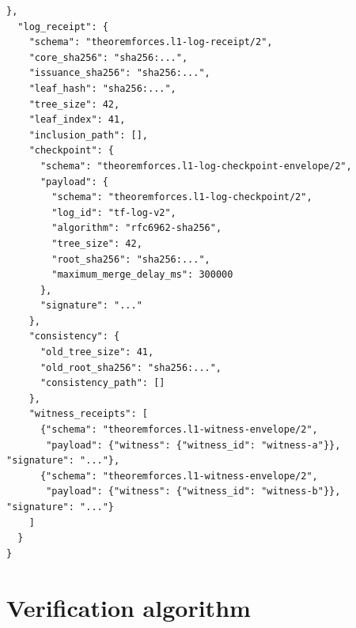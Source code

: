 \documentclass[a4paper,11pt]{ltjsarticle}
\begin{document}
\begin{lstlisting}[language={},basicstyle=\ttfamily\scriptsize,caption={Cycle-free certificate envelope topology}]
  },
  "log_receipt": {
    "schema": "theoremforces.l1-log-receipt/2",
    "core_sha256": "sha256:...",
    "issuance_sha256": "sha256:...",
    "leaf_hash": "sha256:...",
    "tree_size": 42,
    "leaf_index": 41,
    "inclusion_path": [],
    "checkpoint": {
      "schema": "theoremforces.l1-log-checkpoint-envelope/2",
      "payload": {
        "schema": "theoremforces.l1-log-checkpoint/2",
        "log_id": "tf-log-v2",
        "algorithm": "rfc6962-sha256",
        "tree_size": 42,
        "root_sha256": "sha256:...",
        "maximum_merge_delay_ms": 300000
      },
      "signature": "..."
    },
    "consistency": {
      "old_tree_size": 41,
      "old_root_sha256": "sha256:...",
      "consistency_path": []
    },
    "witness_receipts": [
      {"schema": "theoremforces.l1-witness-envelope/2",
       "payload": {"witness": {"witness_id": "witness-a"}}, "signature": "..."},
      {"schema": "theoremforces.l1-witness-envelope/2",
       "payload": {"witness": {"witness_id": "witness-b"}}, "signature": "..."}
    ]
  }
}
\end{lstlisting}

\section{Verification algorithm}
\end{document}

